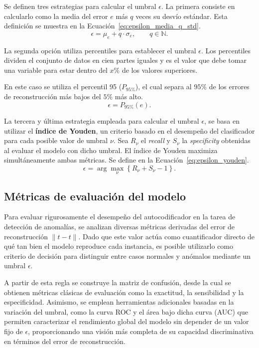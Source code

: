 \documentclass[a4paper,10pt]{book}
\begin{document}
Se definen tres estrategias para calcular el umbral $\epsilon$. La primera consiste en calcularlo como la media del error $e$ más $q$ veces su desvío estándar. Esta definición se muestra en la Ecuación~\ref{eq:epsilon_media_q_std}.
\begin{equation}
	\epsilon
	= \mu_{e} + q \cdot \sigma_{e},
	\qquad
	q \in \mathbb{N}.
	\label{eq:epsilon_media_q_std}
\end{equation}

La segunda opción utiliza percentiles para establecer el umbral $\epsilon$. Los percentiles dividen el conjunto de datos en cien partes iguales y es el valor que debe tomar una variable para estar dentro del $x\%$ de los valores superiores.

En este caso se utiliza el percentil 95 ($P_{95\%}$), el cual separa al $95\%$ de los errores de reconstrucción más bajos del $5\%$ más alto.
\begin{equation}
	\epsilon = P_{95\%}(e).
	\label{eq:epsilon_p95}
\end{equation}

La tercera y última estrategia empleada para calcular el umbral $\epsilon$, se basa en utilizar el \textbf{índice de Youden}, un criterio basado en el desempeño del clasificador para cada posible valor de umbral $\nu$. Sea $R_{\nu}$ el \emph{recall} y $S_{\nu}$ la \emph{specificity} obtenidas al evaluar el modelo con dicho umbral. El índice de Youden maximiza simultáneamente ambas métricas. Se define en la Ecuación~\ref{eq:epsilon_youden}.
\begin{equation}
	\epsilon
	= \arg\max_{\nu} \left\{ R_{\nu} + S_{\nu} - 1 \right\}.
	\label{eq:epsilon_youden}
\end{equation}

\subsection{Métricas de evaluación del modelo}

Para evaluar rigurosamente el desempeño del autocodificador en la tarea de detección de anomalías, se analizan diversas métricas derivadas del error de reconstrucción $\lVert \hat{t} - t \rVert$. Dado que este valor actúa como cuantificador directo de qué tan bien el modelo reproduce cada instancia, es posible utilizarlo como criterio de decisión para distinguir entre casos normales y anómalos mediante un umbral $\epsilon$.

A partir de esta regla se construye la matriz de confusión, desde la cual se obtienen métricas clásicas de evaluación como la exactitud, la sensibilidad y la especificidad. Asimismo, se emplean herramientas adicionales basadas en la variación del umbral, como la curva ROC y el área bajo dicha curva (AUC) que permiten caracterizar el rendimiento global del modelo sin depender de un valor fijo de $\epsilon$, proporcionando una visión más completa de su capacidad discriminativa en términos del error de reconstrucción.\\
\end{document}
